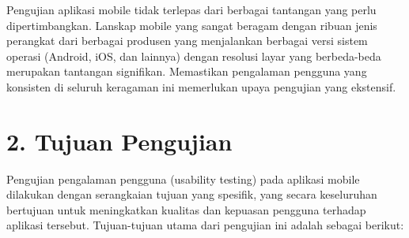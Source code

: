 \documentclass[a4paper, 12pt]{article}
\begin{document}
Pengujian aplikasi mobile tidak terlepas dari berbagai tantangan yang perlu dipertimbangkan. Lanskap mobile yang sangat beragam dengan ribuan jenis perangkat dari berbagai produsen yang menjalankan berbagai versi sistem operasi (Android, iOS, dan lainnya) dengan resolusi layar yang berbeda-beda merupakan tantangan signifikan. Memastikan pengalaman pengguna yang konsisten di seluruh keragaman ini memerlukan upaya pengujian yang ekstensif.

\section*{2. Tujuan Pengujian}
Pengujian pengalaman pengguna (usability testing) pada aplikasi mobile dilakukan dengan serangkaian tujuan yang spesifik, yang secara keseluruhan bertujuan untuk meningkatkan kualitas dan kepuasan pengguna terhadap aplikasi tersebut. Tujuan-tujuan utama dari pengujian ini adalah sebagai berikut:
\end{document}
